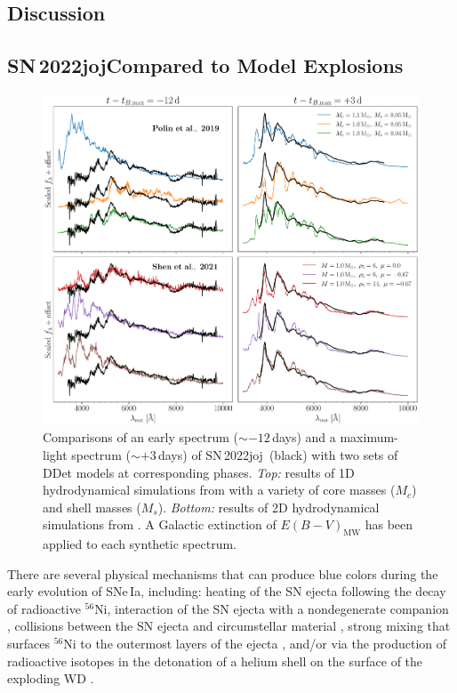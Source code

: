 \documentclass[twocolumn]{aastex631}
\newcommand{\sn}{SN\,2022joj}
\newcommand{\chang}[1]{\textcolor{blue}{[Chang: #1]}}
\begin{document}
\begin{CJK*}{UTF8}{gbsn}


\section{Discussion} \label{sec:discussion}
\subsection{\sn Compared to Model Explosions} \label{sec:model}

\begin{figure}
    \centering
    \includegraphics[width=\linewidth]{model_comparison_spec.pdf}
    \caption{Comparisons of an early spectrum ($\sim$$-12$\,days) and a maximum-light spectrum ($\sim$$+3$\,days) of \sn\ (black) with two sets of DDet models at corresponding phases. \textit{Top:} results of 1D hydrodynamical simulations from \citet{polin_observational_2019} with a variety of core masses ($M_c$) and shell masses ($M_s$). \textit{Bottom:} results of 2D hydrodynamical simulations from \citep{Shen_2D_2021}. A Galactic extinction of ${E(B-V)_\mathrm{MW}}$ has been applied to each synthetic spectrum.}
    \label{fig:model_spec}
\end{figure}


There are several physical mechanisms that can produce blue colors during the early evolution of SNe\,Ia, including: heating of the SN ejecta following the decay of radioactive $^{56}$Ni, interaction of the SN ejecta with a nondegenerate companion \citep[e.g.,][]{Kasen_2010}, collisions between the SN ejecta and circumstellar material \citep[e.g.,][]{Piro_2016}, strong mixing that surfaces $^{56}$Ni to the outermost layers of the ejecta \citep[e.g.,][]{Piro_2013,Magee_2020}, and/or via the production of radioactive isotopes in the detonation of a helium shell on the surface of the exploding WD \citep[e.g.,][]{Noebauer_2017,polin_observational_2019}. %


\end{CJK*}
\end{document}
